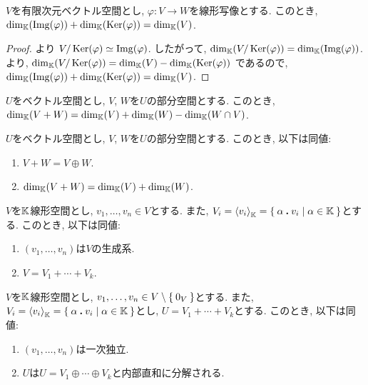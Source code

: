 \begin{cor}
  $V$を有限次元ベクトル空間とし,
  $\varphi\colon V\to W$を線形写像とする.
  このとき,
  $\dim_{\mathbb{K}}(\operatorname{Img}(\varphi))+\dim_{\mathbb{K}}(\operatorname{Ker}(\varphi))=\dim_{\mathbb{K}}(V)$.
\end{cor}
\begin{proof}
  より $V/\operatorname{Ker}(\varphi) \simeq \operatorname{Img}(\varphi)$.
  したがって,
  $\dim_{\mathbb{K}}(V/\operatorname{Ker}(\varphi))=\dim_{\mathbb{K}}(\operatorname{Img}(\varphi))$.
  より,
  $\dim_{\mathbb{K}}(V/\operatorname{Ker}(\varphi))=\dim_{\mathbb{K}}(V)-\dim_{\mathbb{K}}(\operatorname{Ker}(\varphi))$
  であるので,
  $\dim_{\mathbb{K}}(\operatorname{Img}(\varphi))+\dim_{\mathbb{K}}(\operatorname{Ker}(\varphi))=\dim_{\mathbb{K}}(V)$.
\end{proof}



\begin{prop}
  $U$をベクトル空間とし, $V$, $W$を$U$の部分空間とする.
  このとき,  $\dim_{\mathbb{K}}(V+W)=\dim_{\mathbb{K}}(V)+\dim_{\mathbb{K}}(W) - \dim_{\mathbb{K}}(W\cap V)$.
\end{prop}

\begin{cor}
  $U$をベクトル空間とし, $V$, $W$を$U$の部分空間とする.
  このとき, 以下は同値:
  \begin{enumerate}
  \item $V+W=V\oplus W$.
  \item $\dim_{\mathbb{K}}(V+W)=\dim_{\mathbb{K}}(V)+\dim_{\mathbb{K}}(W)$.
  \end{enumerate}
\end{cor}



\begin{prop}
  $V$を$\mathbb{K}$線形空間とし,
  $v_1,\ldots, v_n\in V$とする.
  また,
  $V_i=\Braket{v_i}_{\mathbb{K}}=\Set{\alpha \mathbin{\boldsymbol{.}}v_i|\alpha \in\mathbb{K}}$とする.
  このとき, 以下は同値:
  \begin{enumerate}
  \item $(v_1,\ldots, v_n)$は$V$の生成系.
  \item $V=V_1+\cdots + V_k$.
  \end{enumerate}
\end{prop}

\begin{prop}
  $V$を$\mathbb{K}$線形空間とし,
  $v_1,\ldots, v_n\in V\setminus\Set{0_V}$とする.
  また,
  $V_i=\Braket{v_i}_{\mathbb{K}}=\Set{\alpha \mathbin{\boldsymbol{.}}v_i|\alpha\in\mathbb{K}}$とし,
  $U=V_1+\cdots + V_k$とする.
  このとき, 以下は同値:
  \begin{enumerate}
  \item $(v_1,\ldots, v_n)$は一次独立.
  \item $U$は$U=V_1\oplus\cdots \oplus V_k$と内部直和に分解される.
  \end{enumerate}
\end{prop}

